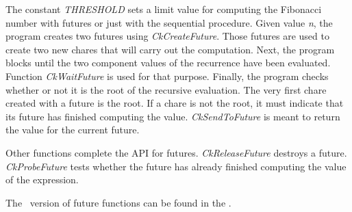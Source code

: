 The constant {\em THRESHOLD} sets a limit value for computing the Fibonacci
number with futures or just with the sequential procedure. Given value {\em n},
the program creates two futures using {\em CkCreateFuture}. Those futures are
used to create two new chares that will carry out the computation. Next, the
program blocks until the two component values of the recurrence have been
evaluated. Function {\em CkWaitFuture} is used for that purpose. Finally, the
program checks whether or not it is the root of the recursive evaluation. The very first
chare created with a future is the root. If a chare is not the root,
it must indicate that its future has finished computing the value. {\em
CkSendToFuture} is meant to return the value for the current future.

Other functions complete the API for futures. {\em CkReleaseFuture} destroys a
future. {\em CkProbeFuture} tests whether the future has already finished computing
the value of the expression.

The \converse\ version of future functions can be found in the
.

